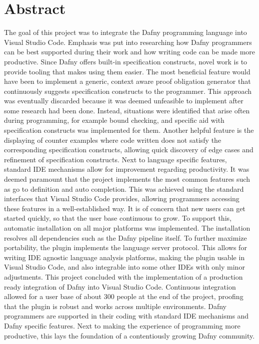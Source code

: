 \section{Abstract}
The goal of this project was to integrate the Dafny programming language into Visual Studio Code. Emphasis was put into researching how Dafny programmers can be best supported during their work and how writing code can be made more productive.\newline 
Since Dafny offers built-in specification constructs, novel work is to provide tooling that makes using them easier. The most beneficial feature would have been to implement a generic, context aware proof obligation generator that continuously suggests specification constructs to the programmer. This approach was eventually discarded because it was deemed unfeasible to implement after some research had been done. Instead, situations were identified that arise often during programming, for example bound checking, and specific aid with specification constructs was implemented for them. Another helpful feature is the displaying of counter examples where code written does not satisfy the corresponding specification constructs, allowing quick discovery of edge cases and refinement of specification constructs.\newline 
Next to language specific features, standard IDE mechanisms allow for improvement regarding productivity. It was deemed paramount that the project implements the most common features such as go to definition and auto completion. This was achieved using the standard interfaces that Visual Studio Code provides, allowing programmers accessing these features in a well-established way.\newline
It is of concern that new users can get started quickly, so that the user base continuous to grow. To support this, automatic installation on all major platforms was implemented. The installation resolves all dependencies such as the Dafny pipeline itself. To further maximize portability, the plugin implements the language server protocol. This allows for writing IDE agnostic language analysis platforms, making the plugin usable in Visual Studio Code, and also integrable into some other IDEs with only minor adjustments.\newline
This project concluded with the implementation of a production ready integration of Dafny into Visual Studio Code. Continuous integration allowed for a user base of about 300 people at the end of the project, proofing that the plugin is robust and works across multiple environments. Dafny programmers are supported in their coding with standard IDE mechanisms and Dafny specific features. Next to making the experience of programming more productive, this lays the foundation of a contentiously growing Dafny community.\newline






